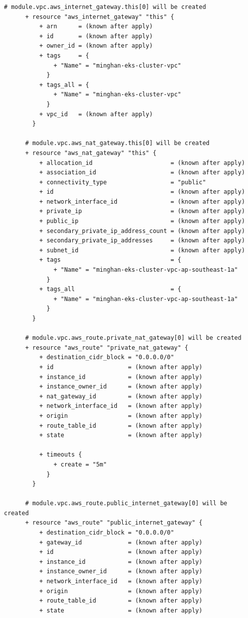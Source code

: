\begin{lstlisting}[caption={terraform plan output for \texttt{cloudkube} provisioning}, breaklines=true, breakatwhitespace=false]
      # module.vpc.aws_internet_gateway.this[0] will be created
      + resource "aws_internet_gateway" "this" {
          + arn      = (known after apply)
          + id       = (known after apply)
          + owner_id = (known after apply)
          + tags     = {
              + "Name" = "minghan-eks-cluster-vpc"
            }
          + tags_all = {
              + "Name" = "minghan-eks-cluster-vpc"
            }
          + vpc_id   = (known after apply)
        }
    
      # module.vpc.aws_nat_gateway.this[0] will be created
      + resource "aws_nat_gateway" "this" {
          + allocation_id                      = (known after apply)
          + association_id                     = (known after apply)
          + connectivity_type                  = "public"
          + id                                 = (known after apply)
          + network_interface_id               = (known after apply)
          + private_ip                         = (known after apply)
          + public_ip                          = (known after apply)
          + secondary_private_ip_address_count = (known after apply)
          + secondary_private_ip_addresses     = (known after apply)
          + subnet_id                          = (known after apply)
          + tags                               = {
              + "Name" = "minghan-eks-cluster-vpc-ap-southeast-1a"
            }
          + tags_all                           = {
              + "Name" = "minghan-eks-cluster-vpc-ap-southeast-1a"
            }
        }
    
      # module.vpc.aws_route.private_nat_gateway[0] will be created
      + resource "aws_route" "private_nat_gateway" {
          + destination_cidr_block = "0.0.0.0/0"
          + id                     = (known after apply)
          + instance_id            = (known after apply)
          + instance_owner_id      = (known after apply)
          + nat_gateway_id         = (known after apply)
          + network_interface_id   = (known after apply)
          + origin                 = (known after apply)
          + route_table_id         = (known after apply)
          + state                  = (known after apply)
    
          + timeouts {
              + create = "5m"
            }
        }
    
      # module.vpc.aws_route.public_internet_gateway[0] will be created
      + resource "aws_route" "public_internet_gateway" {
          + destination_cidr_block = "0.0.0.0/0"
          + gateway_id             = (known after apply)
          + id                     = (known after apply)
          + instance_id            = (known after apply)
          + instance_owner_id      = (known after apply)
          + network_interface_id   = (known after apply)
          + origin                 = (known after apply)
          + route_table_id         = (known after apply)
          + state                  = (known after apply)
    

\end{lstlisting}

